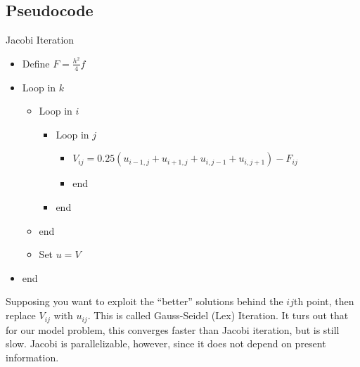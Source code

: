\documentclass{article}
\begin{document}
        \subsection{Pseudocode}
            Jacobi Iteration
            \begin{itemize}[label={}]
                \item Define $F = \frac{h^2}{4}f$
                \item Loop in $k$
                \begin{itemize}[label={}]
                    \item Loop in $i$
                    \begin{itemize}[label={}]
                        \item Loop in $j$
                        \begin{itemize}[label={}]
                            \item $V_{ij} = 0.25(u_{i-1,j} + u_{i+1,j} + u_{i,j-1} + u_{i,j+1}) - F_{ij}$
                            \item end
                        \end{itemize}
                        \item end
                    \end{itemize}
                    \item end
                    \item Set $u = V$
                \end{itemize}
                \item end
            \end{itemize}
            Supposing you want to exploit the ``better'' solutions behind the $ij$th point, then replace $V_{ij}$ with $u_{ij}$.  This is called Gauss-Seidel (Lex) Iteration.  It turs out that for our model problem, this converges faster than Jacobi iteration, but is still slow.  Jacobi is parallelizable, however, since it does not depend on present information.
\end{document}
